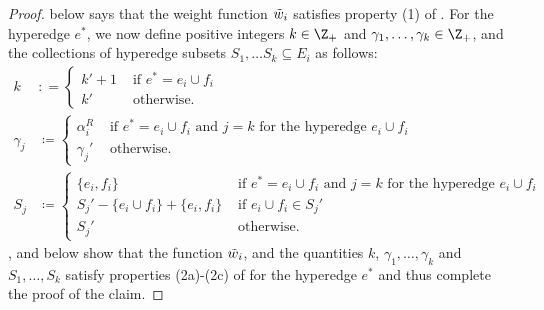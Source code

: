 \begin{proof}
     below says that the weight function $\Tilde{w}_i$ satisfies property (1) of . For the hyperedge $e^*$, we now define positive integers $k \in \Z_+$ and $\gamma_1, \ldots, \gamma_{k} \in \Z_+$, and the collections of hyperedge subsets $S_1, \ldots S_{k} \subseteq E_{i}$ as follows:
    \begin{align*}
        k &: =\begin{cases}
            k' + 1& \text{ if } e^* = e_i\cup f_i\\
            k'&\text{ otherwise.}
        \end{cases}&\\
        \gamma_j&\coloneqq  \begin{cases}
            \alpha_i^R& \text{ if } e^* = e_i\cup f_i \text{ and } j = k \text{ for the hyperedge $e_i\cup f_i$}\\
            \gamma_j'&\text{ otherwise}.
        \end{cases}&\\
        S_j& \coloneqq  \begin{cases}
            \{e_i, f_i\}&\text{ if } e^* = e_i\cup f_i \text{ and } j = k \text{ for the hyperedge $e_i\cup f_i$}\\
            S_j' - \{e_i\cup f_i\} + \{e_i, f_i\}&\text{ if } e_i\cup f_i \in S_j'\\
            S_j'& \text{ otherwise.}
        \end{cases}&
    \end{align*}
    ,  and  below show that the function $\Tilde{w}_i$, and the quantities $k$, $\gamma_1, \ldots, \gamma_k$ and $S_1, \ldots, S_k$ satisfy properties (2a)-(2c) of  for the hyperedge $e^*$ and thus complete the proof of the claim.
\end{proof}

